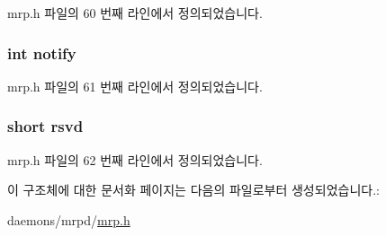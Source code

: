 mrp.\+h 파일의 60 번째 라인에서 정의되었습니다.

\subsubsection[{\texorpdfstring{notify}{notify}}]{\setlength{\rightskip}{0pt plus 5cm}int notify}\hypertarget{structmrp__registrar__attribute_a6c17ea8bcc28c91e490e1112d5348541}{}\label{structmrp__registrar__attribute_a6c17ea8bcc28c91e490e1112d5348541}


mrp.\+h 파일의 61 번째 라인에서 정의되었습니다.

\subsubsection[{\texorpdfstring{rsvd}{rsvd}}]{\setlength{\rightskip}{0pt plus 5cm}short rsvd}\hypertarget{structmrp__registrar__attribute_adf087f747a68e06e9381f967846e7596}{}\label{structmrp__registrar__attribute_adf087f747a68e06e9381f967846e7596}


mrp.\+h 파일의 62 번째 라인에서 정의되었습니다.



이 구조체에 대한 문서화 페이지는 다음의 파일로부터 생성되었습니다.\+:\begin{DoxyCompactItemize}
\item 
daemons/mrpd/\hyperlink{mrp_8h}{mrp.\+h}\end{DoxyCompactItemize}
